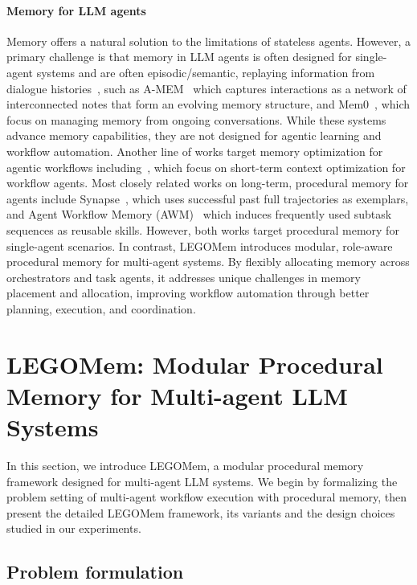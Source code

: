\documentclass[sigconf]{aamas}
\newcommand{\legomem}{LEGOMem}
\begin{document}
\paragraph{Memory for LLM agents}
Memory offers a natural solution to the limitations of stateless agents. However, a primary challenge is that memory in LLM agents is often designed for single-agent systems and are often episodic/semantic, replaying information from dialogue histories~\cite{zhong2024memorybank, sun2025hierarchical, rasmussen2025zep, wu2024longmemeval, maharana2024evaluating}, such as A-MEM~\cite{xuAMEMAgenticMemory2025} which captures interactions as a network of interconnected notes that form an evolving memory structure, and Mem0~\cite{chhikaraMem0BuildingProductionReady2025}, which focus on managing memory from ongoing conversations.
While these systems advance memory capabilities, they are not designed for agentic learning and workflow automation.
Another line of works target memory optimization for agentic workflows including~\cite{lee2025learning, kang2025acon, zhou2025mem1}, which focus on short-term context optimization for workflow agents. 
Most closely related works on long-term, procedural memory for agents include Synapse~\cite{zheng2023synapse}, which uses successful past full trajectories as exemplars, and Agent Workflow Memory (AWM)~\cite{wangAgentWorkflowMemory2024} which induces frequently used subtask sequences as reusable skills. However, both works target procedural memory for single-agent scenarios. In contrast, \legomem{} introduces modular, role-aware procedural memory for multi-agent systems. By flexibly allocating memory across orchestrators and task agents, it addresses unique challenges in memory placement and allocation, improving workflow automation through better planning, execution, and coordination. 


\section{\legomem{}: Modular Procedural Memory for Multi-agent LLM Systems}
\label{sec:method}
In this section, we introduce \legomem{}, a modular procedural memory framework designed for multi-agent LLM systems. We begin by formalizing the problem setting of multi-agent workflow execution with procedural memory, then present the detailed \legomem{} framework, its variants and the design choices studied in our experiments.


\subsection{Problem formulation}
\end{document}
